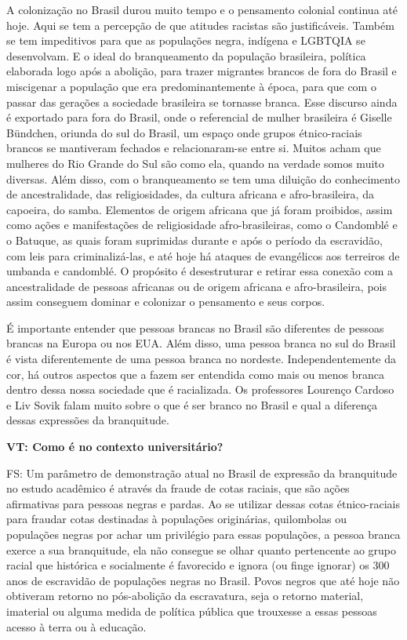 \documentclass[a4paper,
fontsize=11pt,
oneside,
numbers=noperiodatend,
parskip=half-,
bibliography=totoc,
final
]{scrartcl}
\begin{document}
A colonização no Brasil durou muito tempo e o pensamento colonial
continua até hoje. Aqui se tem a percepção de que atitudes racistas são
justificáveis. Também se tem impeditivos para que as populações negra,
indígena e LGBTQIA se desenvolvam. E o ideal do branqueamento da
população brasileira, política elaborada logo após a abolição, para
trazer migrantes brancos de fora do Brasil e miscigenar a população que
era predominantemente à época, para que com o passar das gerações a
sociedade brasileira se tornasse branca. Esse discurso ainda é exportado
para fora do Brasil, onde o referencial de mulher brasileira é Giselle
Bündchen, oriunda do sul do Brasil, um espaço onde grupos étnico-raciais
brancos se mantiveram fechados e relacionaram-se entre si. Muitos acham
que mulheres do Rio Grande do Sul são como ela, quando na verdade somos
muito diversas. Além disso, com o branqueamento se tem uma diluição do
conhecimento de ancestralidade, das religiosidades, da cultura africana
e afro-brasileira, da capoeira, do samba. Elementos de origem africana
que já foram proibidos, assim como ações e manifestações de
religiosidade afro-brasileiras, como o Candomblé e o Batuque, as quais
foram suprimidas durante e após o período da escravidão, com leis para
criminalizá-las, e até hoje há ataques de evangélicos aos terreiros de
umbanda e candomblé. O propósito é desestruturar e retirar essa conexão
com a ancestralidade de pessoas africanas ou de origem africana e
afro-brasileira, pois assim conseguem dominar e colonizar o pensamento e
seus corpos.

É importante entender que pessoas brancas no Brasil são diferentes de
pessoas brancas na Europa ou nos EUA. Além disso, uma pessoa branca no
sul do Brasil é vista diferentemente de uma pessoa branca no nordeste.
Independentemente da cor, há outros aspectos que a fazem ser entendida
como mais ou menos branca dentro dessa nossa sociedade que é
racializada. Os professores Lourenço Cardoso e Liv Sovik falam muito
sobre o que é ser branco no Brasil e qual a diferença dessas expressões
da branquitude.

\textbf{VT: Como é no contexto universitário?}

FS: Um parâmetro de demonstração atual no Brasil de expressão da
branquitude no estudo acadêmico é através da fraude de cotas raciais,
que são ações afirmativas para pessoas negras e pardas. Ao se utilizar
dessas cotas étnico-raciais para fraudar cotas destinadas à populações
originárias, quilombolas ou populações negras por achar um privilégio
para essas populações, a pessoa branca exerce a sua branquitude, ela não
consegue se olhar quanto pertencente ao grupo racial que histórica e
socialmente é favorecido e ignora (ou finge ignorar) os 300 anos de
escravidão de populações negras no Brasil. Povos negros que até hoje não
obtiveram retorno no pós-abolição da escravatura, seja o retorno
material, imaterial ou alguma medida de política pública que trouxesse a
essas pessoas acesso à terra ou à educação.
\end{document}
